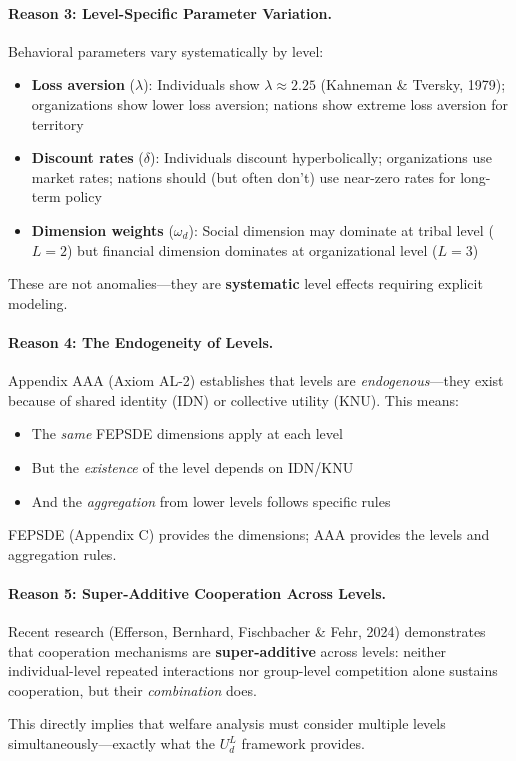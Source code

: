 \begin{tcolorbox}[colback=gray!5!white, colframe=gray!75!black, 
    title=Why AAA $\times$ C Is Theoretically Necessary]
\paragraph{Reason 3: Level-Specific Parameter Variation.}

Behavioral parameters vary systematically by level:
\begin{itemize}[nosep]
\item \textbf{Loss aversion} ($\lambda$): Individuals show $\lambda \approx 2.25$ (Kahneman \& Tversky, 1979); 
      organizations show lower loss aversion; nations show extreme loss aversion for territory
\item \textbf{Discount rates} ($\delta$): Individuals discount hyperbolically; organizations use 
      market rates; nations should (but often don't) use near-zero rates for long-term policy
\item \textbf{Dimension weights} ($\omega_d$): Social dimension may dominate at tribal level ($L=2$) 
      but financial dimension dominates at organizational level ($L=3$)
\end{itemize}

These are not anomalies---they are \textbf{systematic} level effects requiring explicit modeling.

\paragraph{Reason 4: The Endogeneity of Levels.}

Appendix AAA (Axiom AL-2) establishes that levels are \textit{endogenous}---they exist 
because of shared identity (IDN) or collective utility (KNU). This means:
\begin{itemize}[nosep]
\item The \textit{same} FEPSDE dimensions apply at each level
\item But the \textit{existence} of the level depends on IDN/KNU
\item And the \textit{aggregation} from lower levels follows specific rules
\end{itemize}

FEPSDE (Appendix C) provides the dimensions; AAA provides the levels and aggregation rules.

\paragraph{Reason 5: Super-Additive Cooperation Across Levels.}

Recent research (Efferson, Bernhard, Fischbacher \& Fehr, 2024) demonstrates that 
cooperation mechanisms are \textbf{super-additive} across levels: neither individual-level 
repeated interactions nor group-level competition alone sustains cooperation, but their 
\textit{combination} does.

This directly implies that welfare analysis must consider multiple levels simultaneously---exactly 
what the $U^L_d$ framework provides.

\end{tcolorbox}

